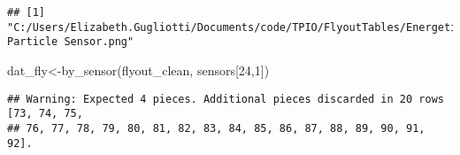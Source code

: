 \documentclass[
]{article}
\newenvironment{Shaded}{\begin{snugshade}}{\end{snugshade}}
\newcommand{\DecValTok}[1]{\textcolor[rgb]{0.00,0.00,0.81}{#1}}
\newcommand{\FunctionTok}[1]{\textcolor[rgb]{0.00,0.00,0.00}{#1}}
\newcommand{\NormalTok}[1]{#1}
\newcommand{\OtherTok}[1]{\textcolor[rgb]{0.56,0.35,0.01}{#1}}
\begin{document}
\begin{verbatim}
## [1] "C:/Users/Elizabeth.Gugliotti/Documents/code/TPIO/FlyoutTables/Energetic Particle Sensor.png"
\end{verbatim}

\begin{Shaded}
\begin{Highlighting}[]
\NormalTok{dat\_fly}\OtherTok{\textless{}{-}}\FunctionTok{by\_sensor}\NormalTok{(flyout\_clean, sensors[}\DecValTok{24}\NormalTok{,}\DecValTok{1}\NormalTok{])}
\end{Highlighting}
\end{Shaded}

\begin{verbatim}
## Warning: Expected 4 pieces. Additional pieces discarded in 20 rows [73, 74, 75,
## 76, 77, 78, 79, 80, 81, 82, 83, 84, 85, 86, 87, 88, 89, 90, 91, 92].
\end{verbatim}
\end{document}

